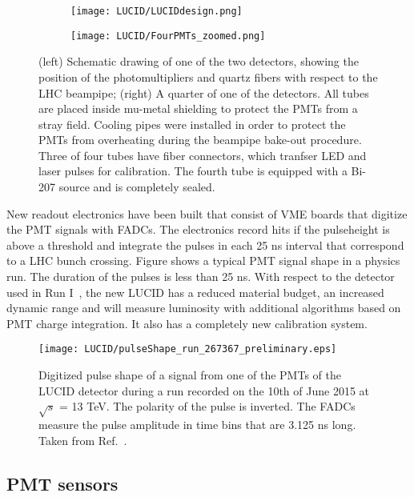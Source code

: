 \begin{figure}
\centering
\begin{subfigure}{.5\textwidth}
  \centering
  \texttt{[image: LUCID/LUCIDdesign.png]}
\end{subfigure}%
\begin{subfigure}{.5\textwidth}
  \centering
  \texttt{[image: LUCID/FourPMTs\_zoomed.png]}
\end{subfigure}
\caption{(left) Schematic drawing of one of the two detectors, showing the position of the photomultipliers 
and quartz fibers with respect to the LHC beampipe; (right) A quarter of one of the detectors. All tubes are 
placed inside mu-metal shielding to protect the PMTs from a stray field. Cooling pipes were installed in order 
to protect the PMTs from overheating during the beampipe bake-out procedure. Three of four tubes have fiber connectors, which
tranfser LED and laser pulses for calibration. The fourth tube is equipped with a Bi-207 source and is completely 
sealed.}
\label{fig:LucidDrawing}
\end{figure}


New readout electronics have been built that consist of VME boards that digitize the PMT signals with FADCs. 
The electronics record hits if the pulseheight is above a threshold and integrate the pulses in each 25 ns 
interval that correspond to a LHC bunch crossing. Figure  shows a typical PMT signal shape in 
a physics run. The duration of the pulses is less than 25 ns.
With respect to the detector used in Run I~\cite{Aad:2013ucp}, the new LUCID has a reduced material budget, 
an increased dynamic 
range and will measure luminosity with additional algorithms based on PMT charge integration. It also has a 
completely new calibration system.

\begin{figure}
\centering
\texttt{[image: LUCID/pulseShape\_run\_267367\_preliminary.eps]}
\caption{Digitized pulse shape of a signal from one of the PMTs of the LUCID detector during a run recorded on 
the 10th of June 2015 at $\sqrt{s}$ = 13 TeV. The polarity of the pulse is inverted. The FADCs measure the 
pulse amplitude in time bins that are 3.125 ns long. Taken from Ref.~\cite{publicPlots}.}
\label{fig:pulseShape}
\end{figure}

\subsection{PMT sensors}

